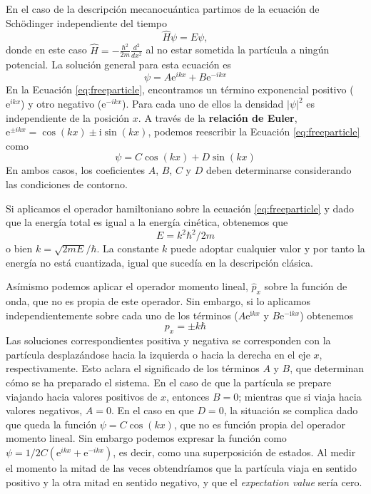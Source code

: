 \documentclass{tufte-handout}
\begin{document}
En el caso de la descripción mecanocuántica partimos de 
la ecuación de Schödinger independiente del tiempo
\begin{equation}
    \hat{H}\psi=E\psi,
\end{equation}
donde en este caso $\hat{H}=-\frac{\hbar^2}{2m}\frac{d^2}{dx^2}$ al
no estar sometida la partícula a ningún potencial. La solución
general para esta ecuación es
\begin{equation}
    \psi = A\mathrm{e}^{ikx}+ B\mathrm{e}^{-ikx}\label{eq:freeparticle}
\end{equation}
En la Ecuación \ref{eq:freeparticle}, encontramos un término
exponencial positivo ($\mathrm{e}^{ikx}$) y otro negativo 
($\mathrm{e}^{-ikx}$). Para cada uno de ellos la densidad 
$|\psi|^2$ es independiente de la posición $x$.
A través de la \textbf{relación de Euler}, 
$\mathrm{e}^{\pm ikx}=\cos(kx)\pm\mathrm{i}\sin(kx)$, podemos reescribir
la Ecuación \ref{eq:freeparticle} como
\begin{equation}
    \psi=C\cos(kx) + D\sin(kx) \label{eq:freepangular}
\end{equation}
En ambos casos, los coeficientes
$A$, $B$, $C$ y $D$ deben determinarse considerando las condiciones
de contorno.

Si aplicamos el operador hamiltoniano sobre la ecuación 
\ref{eq:freeparticle} y dado que la energía total es igual
a la energía cinética, obtenemos que 
\begin{equation}
E=k^2\hbar^2/2m
\end{equation}
o bien $k=\sqrt{2mE}/\hbar$. La constante $k$ puede adoptar
cualquier valor y por tanto la energía no está cuantizada,
igual que sucedía en la descripción clásica. 

Asímismo podemos aplicar el operador momento lineal, 
$\hat{p}_x$ sobre la función de onda, que no es propia
de este operador. Sin embargo, si lo aplicamos 
independientemente sobre cada uno de los términos
($A\mathrm{e}^{\mathrm{i}kx}$ y $B\mathrm{e}^{-\mathrm{i}kx}$)
obtenemos
\begin{equation}
    p_x = \pm k\hbar
\end{equation}
Las soluciones correspondientes positiva y negativa 
se corresponden con la partícula desplazándose
hacia la izquierda o hacia la derecha en el eje $x$, 
respectivamente. Esto aclara el significado de los 
términos $A$ y $B$, que determinan cómo se ha preparado 
el sistema. En el caso de que la partícula se prepare 
viajando hacia valores positivos de $x$, entonces $B=0$; 
mientras que si viaja hacia valores negativos, $A=0$. 
En el caso en que
$D=0$, la situación se complica dado que queda la función
$\psi=C\cos(kx)$, que no es función propia del operador
momento lineal. Sin embargo podemos expresar la función como
$\psi=1/2C(\mathrm{e}^{ikx}+\mathrm{e}^{-ikx})$,
es decir, como una superposición de estados. Al medir el
momento la mitad de las veces obtendríamos que la partícula
viaja en sentido positivo y la otra mitad en sentido
negativo, y que el \textit{expectation value} sería cero.
\end{document}
